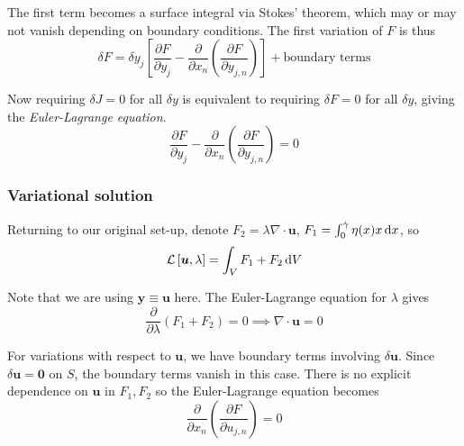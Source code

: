\documentclass{jknotes}
\newcommand{\srate}{\dot{\gamma}}
\begin{document}
The first term becomes a surface integral via Stokes' theorem, which may or
may not vanish depending on boundary conditions. The first variation of $F$ is
thus
\begin{equation}
	\delta F = \delta y_j \left[ \frac{\partial F}{\partial y_j} -
		\frac{\partial}{\partial x_n} \left( \frac{\partial F}{\partial
	y_{j,n}}\right)\right] + \text{boundary terms}
\end{equation}

Now requiring $\delta J = 0$ for all $\delta y$ is equivalent to requiring
$\delta F = 0$ for all $\delta y$, giving the \emph{Euler-Lagrange equation}.
\begin{equation}
\frac{\partial F}{\partial y_j} - \frac{\partial}{\partial x_n} \left(
\frac{\partial F}{\partial y_{j,n}}\right) = 0
\end{equation}

\subsubsection{Variational solution}
Returning to our original set-up, denote $F_2 = \lambda \nabla \cdot \bm{u}$,
$F_1 = \int_0^{\srate} \eta(x)x\,\diffd x$, so
\begin{equation}
	\mathcal{L}\left[\bm{u},\lambda\right] = \int_V F_1 + F_2\,\diffd V
\end{equation}

Note that we are using $\bm{y} \equiv \bm{u}$ here.  The Euler-Lagrange
equation for $\lambda $ gives
\begin{equation}
	\frac{\partial}{\partial \lambda} \left( F_1 + F_2\right) = 0 \implies
	\nabla \cdot \bm{u} = 0
\end{equation}

For variations with respect to $\bm{u}$, we have boundary terms involving
$\delta \bm{u}$. Since $\delta \bm{u} = \bm{0}$ on $S$, the boundary terms
vanish in this case. There is no explicit dependence on $\bm{u}$ in $F_1, F_2$
so the Euler-Lagrange equation becomes
\begin{equation}
	\frac{\partial}{\partial x_n} \left( \frac{\partial F}{\partial
	u_{j,n}}\right) = 0
\end{equation}
\end{document}
